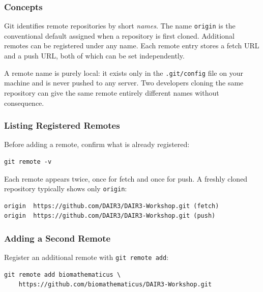 \subsubsection{Concepts}

Git identifies remote repositories by short \emph{names}. The name
\texttt{origin} is the conventional default assigned when a repository
is first cloned. Additional remotes can be registered under any name.
Each remote entry stores a fetch URL and a push URL, both of which can
be set independently.

\begin{infobox}
A remote name is purely local: it exists only in the
\texttt{.git/config} file on your machine and is never pushed to any
server. Two developers cloning the same repository can give the same
remote entirely different names without consequence.
\end{infobox}

\subsubsection{Listing Registered Remotes}

Before adding a remote, confirm what is already registered:

\begin{lstlisting}[style=bashstyle, caption={List all remotes and their URLs}]
git remote -v
\end{lstlisting}

Each remote appears twice, once for fetch and once for push. A freshly
cloned repository typically shows only \texttt{origin}:

\begin{lstlisting}[style=inlineStyle]
origin  https://github.com/DAIR3/DAIR3-Workshop.git (fetch)
origin  https://github.com/DAIR3/DAIR3-Workshop.git (push)
\end{lstlisting}

\subsubsection{Adding a Second Remote}

Register an additional remote with \texttt{git remote add}:

\begin{lstlisting}[style=bashstyle, caption={Register a personal mirror remote (Linux / WSL)}]
git remote add biomathematicus \
    https://github.com/biomathematicus/DAIR3-Workshop.git
\end{lstlisting}


